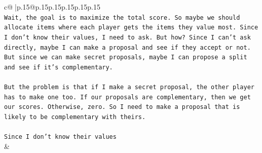 \documentclass{article}
\begin{document}
{\begin{supertabular}{c@{$\;$}|p{.15\linewidth}@{}p{.15\linewidth}p{.15\linewidth}p{.15\linewidth}p{.15\linewidth}p{.15\linewidth}}
{{{\\ 
\texttt{Wait, the goal is to maximize the total score. So maybe we should allocate items where each player gets the items they value most. Since I don't know their values, I need to ask. But how? Since I can't ask directly, maybe I can make a proposal and see if they accept or not. But since we can make secret proposals, maybe I can propose a split and see if it's complementary. } \\
\\ 
\texttt{But the problem is that if I make a secret proposal, the other player has to make one too. If our proposals are complementary, then we get our scores. Otherwise, zero. So I need to make a proposal that is likely to be complementary with theirs. } \\
\\ 
\texttt{Since I don't know their values} \\
            }
        }
    }
    & \\ \\


\end{supertabular}}
\end{document}
